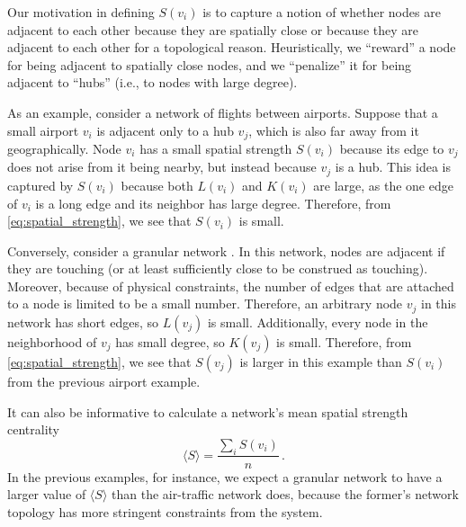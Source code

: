 \documentclass[%
 reprint,
 amsmath,amssymb,
 aps,
]{revtex4-1}
\begin{document}
Our motivation in defining $S(v_i)$ is to capture a notion of whether nodes are adjacent to each other because they are spatially close or because they are adjacent to each other for a topological reason. Heuristically, we ``reward'' a node for being adjacent to spatially close nodes, and we ``penalize'' it for being adjacent to ``hubs'' (i.e., to nodes with large degree).

As an example, consider a network of flights between airports. Suppose that a small airport $v_i$ is adjacent only to a hub $v_j$, which is also far away from it geographically. Node $v_i$ has a small spatial strength $S(v_i)$ because its edge to $v_j$ does not arise from it being nearby, but instead because $v_j$ is a hub. This idea is captured by $S(v_i)$ because both $L(v_i)$ and $K(v_i)$ are large, as the one edge of $v_i$ is a long edge and its neighbor has large degree.
Therefore, from \eqref{eq:spatial_strength}, we see that $S(v_i)$ is small.

Conversely, consider a granular network \cite{papa2018}. In this network, nodes are adjacent if they are touching (or at least sufficiently close to be construed as touching). Moreover, because of physical constraints, the number of edges that are attached to a node is limited to be a small number.
Therefore, an arbitrary node $v_j$ in this network has short edges, so $L(v_j)$ is small. Additionally, every node in the neighborhood of $v_j$ has small degree, so $K(v_j)$ is small. {\color{red}Therefore, from \eqref{eq:spatial_strength}, we see that $S(v_j)$ is larger in this example than $S(v_i)$ from the previous airport example. }



It can also be informative to calculate a network's mean spatial strength centrality
\begin{equation}
    \langle S \rangle = \frac{\sum_i S(v_i)}{n}\,.
\end{equation}
In the previous examples, for instance, we expect a granular network to have a larger value of $\langle S \rangle$ than the air-traffic network does, because the former's network topology has more stringent constraints from the system. 
\end{document}
